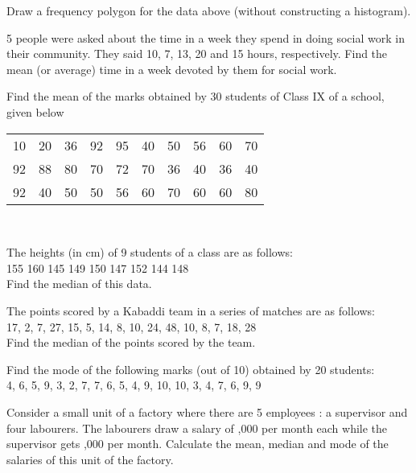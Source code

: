 Draw a frequency polygon for the data above (without constructing a histogram).\\
\item 5 people were asked about the time in a week they spend in doing social work in their community. They said 10, 7, 13, 20 and 15 hours, respectively. Find the mean (or average) time in a week devoted by them for social work.\\
\item Find the mean of the marks obtained by 30 students of Class IX of a school, given below\\

\begin{tabular}{cccccccccc}
10 &20 &36 &92 &95 &40 &50 &56 &60 &70\\
92 &88 &80 &70 &72 &70 &36 &40 &36 &40\\
92 &40 &50 &50 &56 &60 &70 &60 &60 &80\\
\end{tabular}\\

\item The heights (in cm) of 9 students of a class are as follows:\\
155 160 145 149 150 147 152 144 148\\
Find the median of this data.\\
\solution

\item The points scored by a Kabaddi team in a series of matches are as follows:\\
17, 2, 7, 27, 15, 5, 14, 8, 10, 24, 48, 10, 8, 7, 18, 28 \\
Find the median of the points scored by the team.\\
\solution

\item Find the mode of the following marks (out of 10) obtained by 20 students:\\
4, 6, 5, 9, 3, 2, 7, 7, 6, 5, 4, 9, 10, 10, 3, 4, 7, 6, 9, 9\\
\solution

\item Consider a small unit of a factory where there are 5 employees : a supervisor and four labourers. The labourers draw a salary of ,000 per month each while the supervisor gets ,000 per month. Calculate the mean, median and mode
of the salaries of this unit of the factory.\\
\solution




